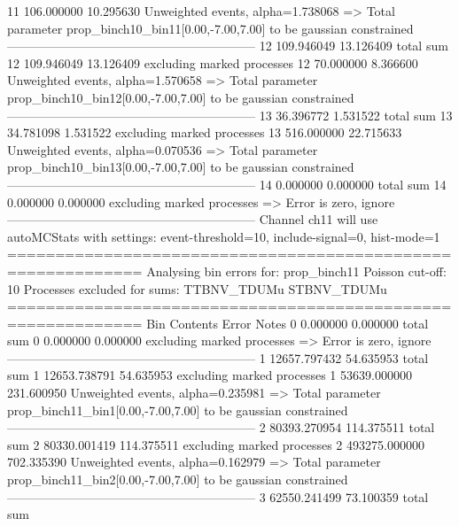 11         106.000000      10.295630       Unweighted events, alpha=1.738068
  => Total parameter prop_binch10_bin11[0.00,-7.00,7.00] to be gaussian constrained
------------------------------------------------------------
12         109.946049      13.126409       total sum                     
12         109.946049      13.126409       excluding marked processes    
12         70.000000       8.366600        Unweighted events, alpha=1.570658
  => Total parameter prop_binch10_bin12[0.00,-7.00,7.00] to be gaussian constrained
------------------------------------------------------------
13         36.396772       1.531522        total sum                     
13         34.781098       1.531522        excluding marked processes    
13         516.000000      22.715633       Unweighted events, alpha=0.070536
  => Total parameter prop_binch10_bin13[0.00,-7.00,7.00] to be gaussian constrained
------------------------------------------------------------
14         0.000000        0.000000        total sum                     
14         0.000000        0.000000        excluding marked processes    
  => Error is zero, ignore      
------------------------------------------------------------
Channel ch11 will use autoMCStats with settings: event-threshold=10, include-signal=0, hist-mode=1
============================================================
Analysing bin errors for: prop_binch11
Poisson cut-off: 10
Processes excluded for sums: TTBNV_TDUMu STBNV_TDUMu
============================================================
Bin        Contents        Error           Notes                         
0          0.000000        0.000000        total sum                     
0          0.000000        0.000000        excluding marked processes    
  => Error is zero, ignore      
------------------------------------------------------------
1          12657.797432    54.635953       total sum                     
1          12653.738791    54.635953       excluding marked processes    
1          53639.000000    231.600950      Unweighted events, alpha=0.235981
  => Total parameter prop_binch11_bin1[0.00,-7.00,7.00] to be gaussian constrained
------------------------------------------------------------
2          80393.270954    114.375511      total sum                     
2          80330.001419    114.375511      excluding marked processes    
2          493275.000000   702.335390      Unweighted events, alpha=0.162979
  => Total parameter prop_binch11_bin2[0.00,-7.00,7.00] to be gaussian constrained
------------------------------------------------------------
3          62550.241499    73.100359       total sum                     
